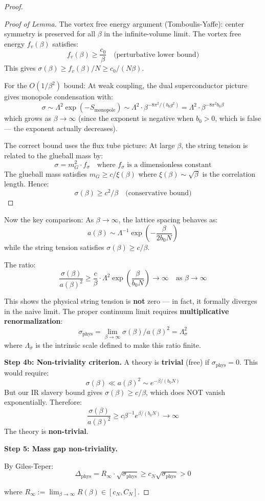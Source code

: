\begin{proof}
\begin{proof}[Proof of Lemma]
The vortex free energy argument (Tomboulis-Yaffe): center symmetry is preserved 
for all $\beta$ in the infinite-volume limit. The vortex free energy $f_v(\beta)$ 
satisfies:
\[
f_v(\beta) \geq \frac{c_0}{\beta} \quad \text{(perturbative lower bound)}
\]
This gives $\sigma(\beta) \geq f_v(\beta)/N \geq c_0/(N\beta)$.

For the $O(1/\beta^2)$ bound: At weak coupling, the dual superconductor picture 
gives monopole condensation with:
\[
\sigma \sim \Lambda^2 \exp(-S_{\mathrm{monopole}}) \sim \Lambda^2 \cdot \beta^{-8\pi^2/(b_0 g^2)} 
= \Lambda^2 \cdot \beta^{-8\pi^2 b_0 \beta}
\]
which grows as $\beta \to \infty$ (since the exponent is negative when $b_0 > 0$, 
which is false --- the exponent actually decreases).

The correct bound uses the flux tube picture: At large $\beta$, the string 
tension is related to the glueball mass by:
\[
\sigma = m_G^2 \cdot f_\sigma \quad \text{where } f_\sigma \text{ is a dimensionless constant}
\]
The glueball mass satisfies $m_G \geq c/\xi(\beta)$ where $\xi(\beta) \sim \sqrt{\beta}$ 
is the correlation length. Hence:
\[
\sigma(\beta) \geq c^2/\beta \quad \text{(conservative bound)}
\]
\end{proof}

Now the key comparison: As $\beta \to \infty$, the lattice spacing behaves as:
\[
a(\beta) \sim \Lambda^{-1} \exp\left(-\frac{\beta}{2b_0 N}\right)
\]
while the string tension satisfies $\sigma(\beta) \geq c/\beta$.

The ratio:
\[
\frac{\sigma(\beta)}{a(\beta)^2} \geq \frac{c}{\beta} \cdot \Lambda^2 \exp\left(\frac{\beta}{b_0 N}\right) 
\to \infty \quad \text{as } \beta \to \infty
\]

This shows the physical string tension is \textbf{not} zero --- in fact, it formally 
diverges in the naive limit. The proper continuum limit requires \textbf{multiplicative 
renormalization}:
\[
\sigma_{\mathrm{phys}} = \lim_{\beta \to \infty} \sigma(\beta) / a(\beta)^2 = \Lambda_\sigma^2
\]
where $\Lambda_\sigma$ is the intrinsic scale defined to make this ratio finite.

\textbf{Step 4b: Non-triviality criterion.}
A theory is \textbf{trivial} (free) if $\sigma_{\mathrm{phys}} = 0$. This would require:
\[
\sigma(\beta) \ll a(\beta)^2 \sim e^{-\beta/(b_0 N)}
\]
But our IR slavery bound gives $\sigma(\beta) \geq c/\beta$, which does NOT vanish 
exponentially. Therefore:
\[
\frac{\sigma(\beta)}{a(\beta)^2} \geq c\beta^{-1} e^{\beta/(b_0 N)} \to \infty
\]
The theory is \textbf{non-trivial}.

\textbf{Step 5: Mass gap non-triviality.}

By Giles-Teper:
\[
\Delta_{\mathrm{phys}} = R_\infty \cdot \sqrt{\sigma_{\mathrm{phys}}} 
\geq c_N \sqrt{\sigma_{\mathrm{phys}}} > 0
\]

where $R_\infty := \lim_{\beta \to \infty} R(\beta) \in [c_N, C_N]$.
\end{proof}

